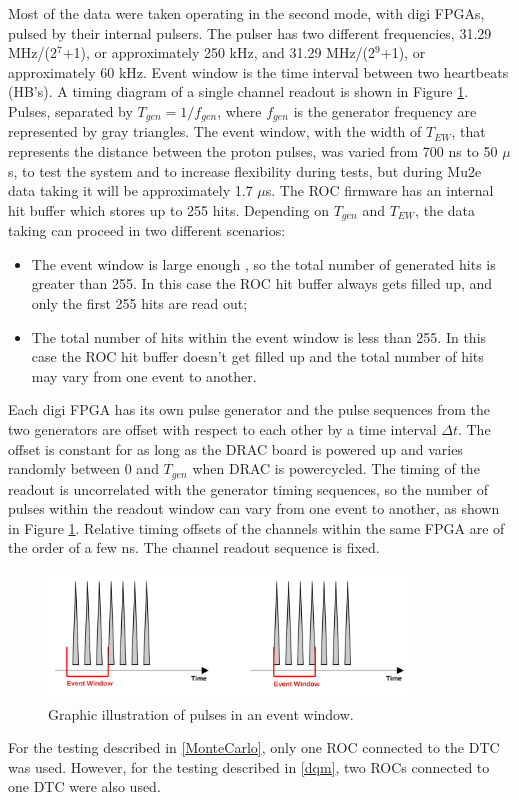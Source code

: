     Most of the data were taken operating in the second mode, with digi FPGAs, pulsed by their internal pulsers.
    The pulser has two different frequencies,  31.29 MHz/(2$^7$+1), or approximately 250 kHz, 
    and 31.29 MHz/(2$^9$+1), or approximately 60 kHz.
    Event window is the time interval between two heartbeats (HB's). 
    A timing diagram of a single channel readout is shown in Figure \ref{fig:3}.
    Pulses, separated by $T_{gen}=1/f_{gen}$, where $f_{gen}$ is the generator frequency
    are represented by gray triangles.
    The event window, with the width of $T_{EW}$, that represents the distance between the proton pulses, 
    was varied from 700 ns to 50 $\mu$s, to test the system and to increase flexibility during tests, but during Mu2e data taking it will be approximately 1.7 $\mu$s. 
    The ROC firmware has an internal hit buffer which stores up to 255 hits.
    Depending on $T_{gen}$ and $T_{EW}$, the data taking can proceed in two different
    scenarios:
    \begin{itemize}
    \item
      The event window is large enough , so the total number of generated hits is greater than 255. In this case
      the ROC hit buffer always gets filled up, and only the first 255 hits are read out;
    \item
      The total number of hits within the event window is less than 255.
      In this case the ROC hit buffer doesn't get filled up and the total number of hits may vary from one event to another.
    \end{itemize}
    Each digi FPGA has its own pulse generator and the pulse sequences from the two
    generators are offset with respect to each other by a time interval $\Delta t$. 
    The offset is constant for as long as the DRAC board is powered up and varies randomly between 0 and $T_{gen}$ when DRAC is powercycled. 
    The timing of the readout is uncorrelated with the generator timing sequences, 
    so the number of pulses within the readout window can vary from one event to another, as shown 
    in Figure \ref{fig:3}. Relative timing offsets of the channels within the same FPGA are of the order of a few ns. The channel readout sequence is fixed.
    \begin{figure}[!h]
    \centering
    \includegraphics[width =0.85\textwidth]{figures/png/finalimg.png}
    \caption{Graphic illustration of pulses in an event window.}
    \label{fig:3}
    \end{figure}
    For the testing described in \ref{MonteCarlo}, only one ROC connected to the DTC was used. However, for the testing described in \ref{dqm}, two ROCs connected to one DTC were also used.
